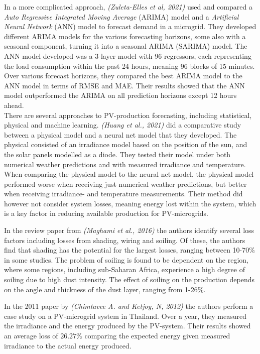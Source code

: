 In a more complicated approach, \textit{(Zuleta-Elles et al, 2021)} used and compared a \textit{Auto Regressive Integrated Moving Average} (ARIMA) model and a \textit{Artificial Neural Network} (ANN) model to forecast demand in a microgrid. They developed different ARIMA models for the various forecasting horizons, some also with a seasonal component, turning it into a seasonal ARIMA (SARIMA) model. The ANN model developed was a 3-layer model with 96 regressors, each representing the load consumption within the past 24 hours, meaning 96 blocks of 15 minutes. Over various forecast horizons, they compared the best ARIMA model to the ANN model in terms of RMSE and MAE. Their results showed that the ANN model outperformed the ARIMA on all prediction horizons except 12 hours ahead. \cite{Zuleta-Elles2021-qh}\\

There are several approaches to PV-production forecasting, including statistical, physical and machine learning. \textit{(Huang et al., 2021)} did a comparative study between a physical model and a neural net model that they developed. The physical consisted of an irradiance model based on the position of the sun, and the solar panels modelled as a diode. They tested their model under both numerical weather predictions and with measured irradiance and temperature. When comparing the physical model to the neural net model, the physical model performed worse when receiving just numerical weather predictions, but better when receiving irradiance- and temperature measurements.\cite{Huang2010-lv} Their method did however not consider system losses, meaning energy lost within the system, which is a key factor in reducing available production for PV-microgrids. 

In the review paper from \textit{(Maghami et al., 2016)} the authors identify several loss factors including losses from shading, wiring and soiling. Of these, the authors find that shading has the potential for the largest losses, ranging between 10-70\% in some studies. The problem of soiling is found to be dependent on the region, where some regions, including sub-Saharan Africa, experience a high degree of soiling due to high dust intensity. The effect of soiling on the production depends on the angle and thickness of the dust layer, ranging from 1-26\%.\cite{Maghami2016-pq} 

In the 2011 paper by \textit{(Chimtavee A. and Ketjoy, N, 2012)} the authors perform a case study on a PV-microgrid system in Thailand. Over a year, they measured the irradiance and the energy produced by the PV-system. Their results showed an average loss of $26.27\%$ comparing the expected energy given measured irradiance to the actual energy produced.\cite{Chimtavee2012-gg}\\ 



